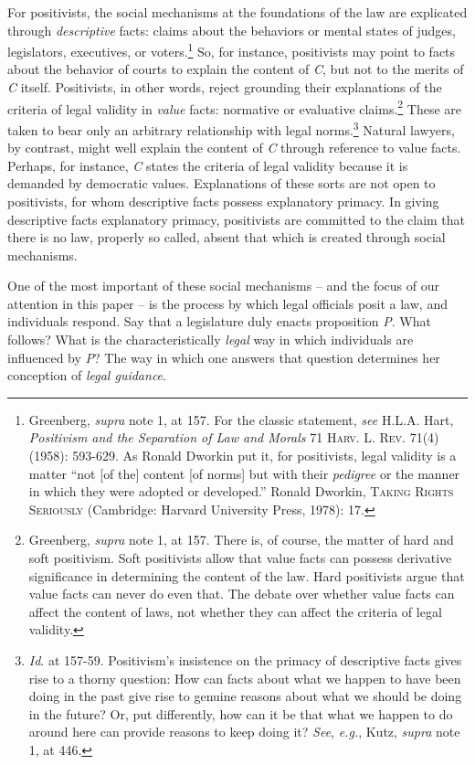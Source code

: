 For positivists, the social mechanisms at the foundations of the law are
explicated through \emph{descriptive} facts: claims about the behaviors
or mental states of judges, legislators, executives, or
voters.\footnote{Greenberg, \emph{supra} note 1, at 157. For the classic
  statement, \emph{see} H.L.A. Hart, \emph{Positivism and the Separation
  of Law and Morals} 71 \textsc{Harv. L. Rev.} 71(4)(1958): 593-629. As
  Ronald Dworkin put it, for positivists, legal validity is a matter
  ``not {[}of the{]} content {[}of norms{]} but with their
  \emph{pedigree} or the manner in which they were adopted or
  developed.'' Ronald Dworkin, \textsc{Taking Rights Seriously}
  (Cambridge: Harvard University Press, 1978): 17.} So, for instance,
positivists may point to facts about the behavior of courts to explain
the content of \emph{C}, but not to the merits of \emph{C} itself.
Positivists, in other words, reject grounding their explanations of the
criteria of legal validity in \emph{value} facts: normative or
evaluative claims.\footnote{Greenberg, \emph{supra} note 1, at 157.
  There is, of course, the matter of hard and soft positivism. Soft
  positivists allow that value facts can possess derivative significance
  in determining the content of the law. Hard positivists argue that
  value facts can never do even that. The debate over whether value
  facts can affect the content of laws, not whether they can affect the
  criteria of legal validity.} These are taken to bear only an arbitrary
relationship with legal norms.\footnote{\emph{Id}. at 157-59.
  Positivism's insistence on the primacy of descriptive facts gives rise
  to a thorny question: How can facts about what we happen to have been
  doing in the past give rise to genuine reasons about what we should be
  doing in the future? Or, put differently, how can it be that what we
  happen to do around here can provide reasons to keep doing it?
  \emph{See}, \emph{e.g.}, Kutz, \emph{supra} note 1, at 446.} Natural
lawyers, by contrast, might well explain the content of \emph{C} through
reference to value facts. Perhaps, for instance, \emph{C} states the
criteria of legal validity because it is demanded by democratic values.
Explanations of these sorts are not open to positivists, for whom
descriptive facts possess explanatory primacy. In giving descriptive
facts explanatory primacy, positivists are committed to the claim that
there is no law, properly so called, absent that which is created
through social mechanisms.

One of the most important of these social mechanisms -- and the focus of
our attention in this paper -- is the process by which legal officials
posit a law, and individuals respond. Say that a legislature duly enacts
proposition \emph{P}. What follows? What is the characteristically
\emph{legal} way in which individuals are influenced by \emph{P}? The
way in which one answers that question determines her conception of
\emph{legal guidance}.

